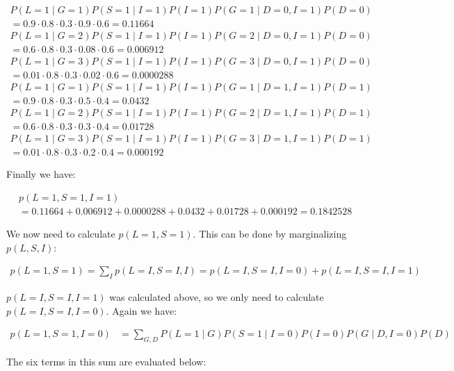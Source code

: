 \documentclass[a4paper, 12pt]{article}
\begin{document}
\begin{align}
	P(L=1 \mid G=1)P(S=1 \mid I=1)P(I=1)P(G=1 \mid D=0,I=1)P(D=0)&\\
	= 0.9 \cdot 0.8 \cdot 0.3 \cdot 0.9 \cdot 0.6 = 0.11664&\\
	P(L=1 \mid G=2)P(S=1 \mid I=1)P(I=1)P(G=2 \mid D=0,I=1)P(D=0)&\\
	= 0.6 \cdot 0.8 \cdot 0.3 \cdot 0.08 \cdot 0.6 = 0.006912&\\
	P(L=1 \mid G=3)P(S=1 \mid I=1)P(I=1)P(G=3 \mid D=0,I=1)P(D=0)&\\
	= 0.01 \cdot 0.8 \cdot 0.3 \cdot 0.02 \cdot 0.6 = 0.0000288&\\
	P(L=1 \mid G=1)P(S=1 \mid I=1)P(I=1)P(G=1 \mid D=1,I=1)P(D=1)&\\
	= 0.9 \cdot 0.8 \cdot 0.3 \cdot 0.5 \cdot 0.4 = 0.0432&\\
	P(L=1 \mid G=2)P(S=1 \mid I=1)P(I=1)P(G=2 \mid D=1,I=1)P(D=1)&\\
	= 0.6 \cdot 0.8 \cdot 0.3 \cdot 0.3 \cdot 0.4 = 0.01728&\\
	P(L=1 \mid G=3)P(S=1 \mid I=1)P(I=1)P(G=3 \mid D=1,I=1)P(D=1)&\\
	= 0.01 \cdot 0.8 \cdot 0.3 \cdot 0.2 \cdot 0.4 = 0.000192&
\end{align}

Finally we have:

\begin{align}
	&p(L=1, S=1, I=1)\\
	&= 0.11664 + 0.006912 + 0.0000288 + 0.0432 + 0.01728 + 0.000192 = 0.1842528
\end{align}

We now need to calculate $p(L=1, S=1)$. This can be done by marginalizing $p(L, S, I)$:

\begin{align}
	p(L=1, S=1) = \sum_I p(L=I, S=I, I) = p(L=I, S=I, I=0) + p(L=I, S=I, I=1)
\end{align}

$p(L=I, S=I, I=1)$ was calculated above, so we only need to calculate $p(L=I, S=I, I=0)$. Again we have:

\begin{align}
	p(L=1, S=1, I=0) &= \sum_{G, D} P(L=1 \mid G)P(S=1 \mid I=0)P(I=0)P(G \mid D,I=0)P(D)
\end{align}

The six terms in this sum are evaluated below:
\end{document}
